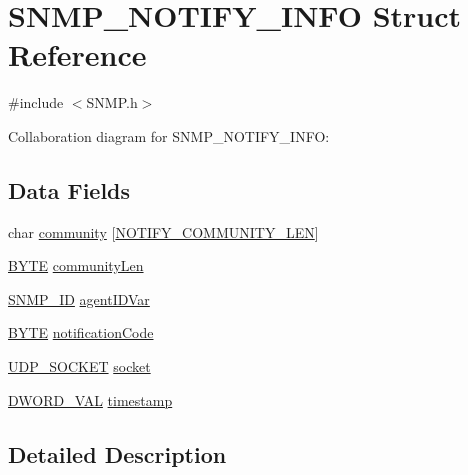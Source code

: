 \hypertarget{struct_s_n_m_p___n_o_t_i_f_y___i_n_f_o}{}\section{S\+N\+M\+P\+\_\+\+N\+O\+T\+I\+F\+Y\+\_\+\+I\+N\+F\+O Struct Reference}
\label{struct_s_n_m_p___n_o_t_i_f_y___i_n_f_o}


{\ttfamily \#include $<$S\+N\+M\+P.\+h$>$}



Collaboration diagram for S\+N\+M\+P\+\_\+\+N\+O\+T\+I\+F\+Y\+\_\+\+I\+N\+F\+O\+:
\subsection*{Data Fields}
\begin{DoxyCompactItemize}
\item 
char \hyperlink{struct_s_n_m_p___n_o_t_i_f_y___i_n_f_o_aec113ff5b59e4ad9bf0914f09da0f5af}{community} \mbox{[}\hyperlink{_t_c_p_i_p_01_m_r_f24_w_8h_a456e98144f999483038854fc763b8746}{N\+O\+T\+I\+F\+Y\+\_\+\+C\+O\+M\+M\+U\+N\+I\+T\+Y\+\_\+\+L\+E\+N}\mbox{]}
\item 
\hyperlink{_generic_type_defs_8h_a4ae1dab0fb4b072a66584546209e7d58}{B\+Y\+T\+E} \hyperlink{struct_s_n_m_p___n_o_t_i_f_y___i_n_f_o_a1c7f631640a7359d70137a0c41b0099c}{community\+Len}
\item 
\hyperlink{_s_n_m_p_8h_a97d5c4fe402fba9b220e62d9f361276a}{S\+N\+M\+P\+\_\+\+I\+D} \hyperlink{struct_s_n_m_p___n_o_t_i_f_y___i_n_f_o_a5bbf81619c03f5ea2a632b761e4f1ab6}{agent\+I\+D\+Var}
\item 
\hyperlink{_generic_type_defs_8h_a4ae1dab0fb4b072a66584546209e7d58}{B\+Y\+T\+E} \hyperlink{struct_s_n_m_p___n_o_t_i_f_y___i_n_f_o_a244447a4430cff9f7a52cbed7f022680}{notification\+Code}
\item 
\hyperlink{_u_d_p_8h_a74f1b6fad75426b918419bbf943179c3}{U\+D\+P\+\_\+\+S\+O\+C\+K\+E\+T} \hyperlink{struct_s_n_m_p___n_o_t_i_f_y___i_n_f_o_a55e70c01256c8243f8acce2fb4d53e23}{socket}
\item 
\hyperlink{union_d_w_o_r_d___v_a_l}{D\+W\+O\+R\+D\+\_\+\+V\+A\+L} \hyperlink{struct_s_n_m_p___n_o_t_i_f_y___i_n_f_o_aef48592763d178f6eb33bee0e7e9512d}{timestamp}
\end{DoxyCompactItemize}


\subsection{Detailed Description}


